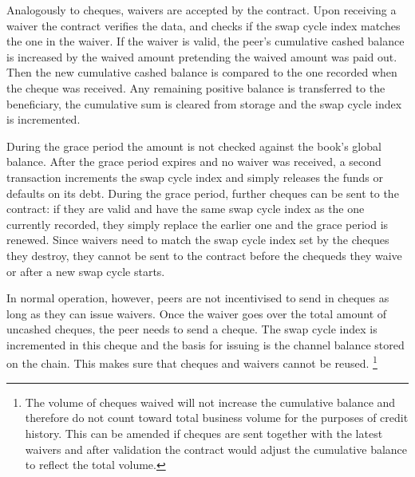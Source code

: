 Analogously to cheques, waivers are accepted by the contract. %
Upon receiving a waiver the contract verifies the data, and checks if the swap cycle index matches the one in the waiver.
If the waiver is valid, the peer's cumulative cashed balance is increased by the waived amount pretending the waived amount was paid out. Then the new cumulative cashed balance is compared to the one recorded when the cheque was received. Any remaining positive balance is transferred to the beneficiary, the cumulative sum is cleared from storage and the swap cycle index is incremented.


During the grace period the amount is not checked against the book's global balance.
After the grace period expires and no waiver was received, a second transaction
increments the swap cycle index and simply releases the funds or defaults on its debt.
During the grace period, further cheques can be sent to the contract: if they are valid and have the same swap cycle index as the one currently recorded, they simply replace the earlier one and the grace period is renewed.
Since waivers need to match the swap cycle index set by the cheques they destroy, they cannot be sent to the contract before the chequeds they waive or after a new swap cycle starts.

In normal operation, however, peers are not incentivised to send in cheques as
long as they can issue waivers. Once the waiver goes over
the total amount of uncashed cheques, the peer needs to send a cheque.
The swap cycle index is incremented in this cheque and the basis for issuing is the channel balance stored on the chain. This makes sure that cheques and waivers cannot be reused.%
%
\footnote{The volume of cheques waived will not increase the cumulative balance and therefore do not count toward total business volume for the purposes of credit history.
This can be amended if cheques are sent together with the latest waivers
and after validation the contract would adjust the cumulative balance to reflect the total volume.}

